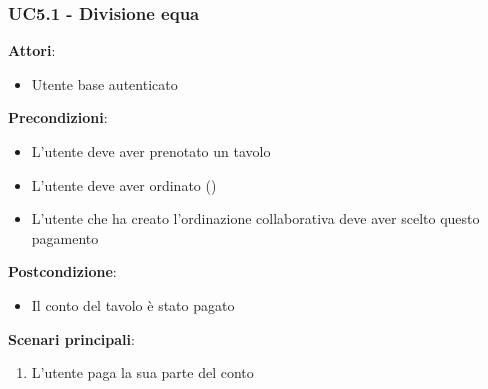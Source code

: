 \subsubsection{UC5.1 - Divisione equa}\label{usecase:5.1}
\textbf{Attori}:
\begin{itemize}
    \item Utente base autenticato
\end{itemize}
\textbf{Precondizioni}:
\begin{itemize}
    \item L'utente deve aver prenotato un tavolo
    \item L'utente deve aver ordinato ()
    \item L'utente che ha creato l'ordinazione collaborativa deve aver scelto questo pagamento
\end{itemize}
\textbf{Postcondizione}:
\begin{itemize}
    \item Il conto del tavolo è stato pagato
\end{itemize}
\textbf{Scenari principali}:
\begin{enumerate}
    \item L'utente paga la sua parte del conto
\end{enumerate}